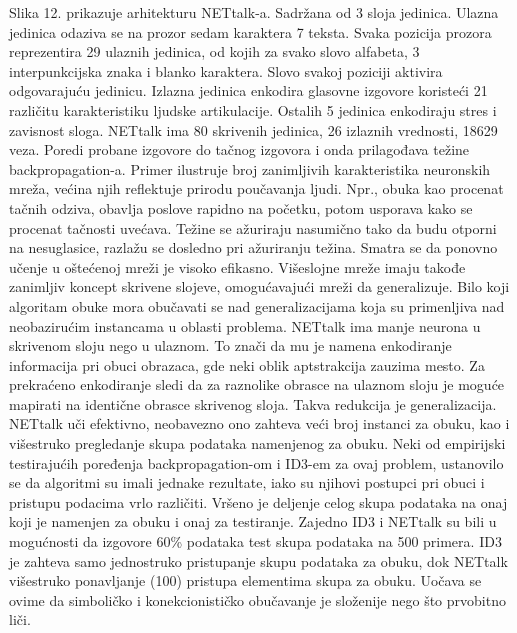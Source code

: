 \documentclass[fontsize=11bp, paper=a4]{scrarticle}
\begin{document}
Slika 12. prikazuje arhitekturu NETtalk-a. Sadržana od 3 sloja jedinica. Ulazna jedinica odaziva se na prozor sedam karaktera 7 teksta. Svaka pozicija prozora reprezentira 29 ulaznih jedinica, od kojih za svako slovo alfabeta, 3 interpunkcijska znaka i blanko karaktera. Slovo svakoj poziciji aktivira odgovarajuću jedinicu. Izlazna jedinica enkodira glasovne izgovore koristeći 21 različitu karakteristiku ljudske artikulacije. Ostalih 5 jedinica enkodiraju stres i zavisnost sloga. NETtalk ima 80 skrivenih jedinica, 26 izlaznih vrednosti, 18629 veza. Poredi probane izgovore do tačnog izgovora i onda prilagođava težine backpropagation-a. Primer ilustruje broj zanimljivih karakteristika neuronskih mreža, većina njih reflektuje prirodu poučavanja ljudi. Npr., obuka kao procenat tačnih odziva, obavlja poslove rapidno na početku, potom usporava kako se procenat tačnosti uvećava. Težine se ažuriraju nasumično tako da budu otporni na nesuglasice, razlažu se dosledno pri ažuriranju težina. Smatra se da ponovno učenje u oštećenoj mreži je visoko efikasno. Višeslojne mreže imaju takođe zanimljiv koncept skrivene slojeve, omogućavajući mreži da generalizuje. Bilo koji algoritam obuke mora obučavati se nad generalizacijama koja su primenljiva nad neobazirućim instancama u oblasti problema. NETtalk ima manje neurona u skrivenom sloju nego u ulaznom. To znači da mu je namena enkodiranje informacija pri obuci obrazaca, gde neki oblik aptstrakcija zauzima mesto. Za prekraćeno enkodiranje sledi da za raznolike obrasce na ulaznom sloju je moguće mapirati na identične obrasce skrivenog sloja. Takva redukcija je generalizacija. NETtalk uči efektivno, neobavezno ono zahteva veći broj instanci za obuku, kao i višestruko pregledanje skupa podataka namenjenog za obuku. Neki od empirijski testirajućih poređenja backpropagation-om i ID3-em\cite{id3} za ovaj problem, ustanovilo se da algoritmi su imali jednake rezultate, iako su njihovi postupci pri obuci i pristupu podacima vrlo različiti. Vršeno je deljenje celog skupa podataka na onaj koji je namenjen za obuku i onaj za testiranje. Zajedno ID3 i NETtalk su bili u mogućnosti da izgovore 60\% podataka test skupa podataka na 500 primera. ID3 je zahteva samo jednostruko pristupanje skupu podataka za obuku, dok NETtalk višestruko ponavljanje (100) pristupa elementima skupa za obuku. Uočava se ovime da simboličko i konekcionističko obučavanje je složenije nego što prvobitno liči. 
\end{document}

